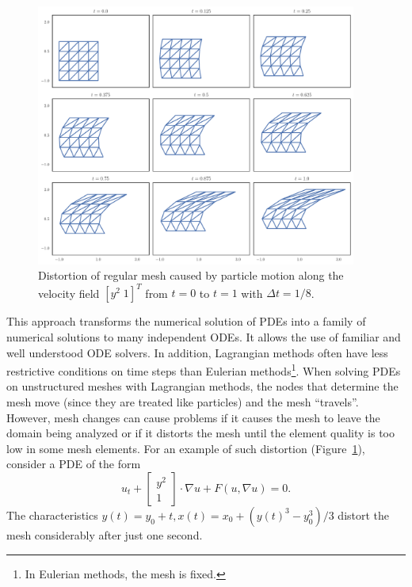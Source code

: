 \begin{figure}
  \includegraphics[width=0.9375\textwidth]
                  {../images/curved-mesh/mesh_distortion.pdf}
  \centering
  \caption{Distortion of regular mesh caused by particle motion along
    the velocity field \(\left[ y^2 \; 1 \right]^T\) from \(t = 0\)
    to \(t = 1\) with \(\Delta t = 1/8\).}
  \label{fig:mesh-distortion}
\end{figure}

This approach transforms the numerical solution of PDEs into a family of
numerical solutions to many independent ODEs. It allows the use of familiar
and well understood ODE solvers. In addition, Lagrangian methods often
have less restrictive conditions on time steps than Eulerian
methods\footnote{In Eulerian methods, the mesh is fixed.}.
When solving PDEs on unstructured meshes
with Lagrangian methods, the nodes that determine the mesh move (since they
are treated like particles) and the mesh ``travels''. However, mesh changes
can cause problems if it causes the mesh to leave the domain being
analyzed or if it distorts the mesh until the element quality is too low
in some mesh elements.
For an example of such distortion (Figure~\ref{fig:mesh-distortion}),
consider a PDE of the form
\begin{equation}
u_t + \left[ \begin{array}{c} y^2 \\ 1 \end{array}\right] \cdot \nabla u +
  F\left(u, \nabla u\right) = 0.
\end{equation}
The characteristics \(y(t) = y_0 + t, x(t) = x_0 +
\left(y(t)^3 - y_0^3\right)/3\)
distort the mesh considerably after just one second.

